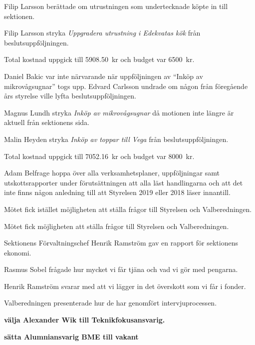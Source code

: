 \documentclass[10pt]{article}
\begin{document}
\begin{paragrafer}
Filip Larsson berättade om utrustningen som undertecknade köpte in till sektionen.

Filip Larsson \ypa stryka \emph{Uppgradera utrustning i Edekvatas kök} från beslutsuppföljningen. 

    Total kostnad uppgick till \SI{5908,50}{kr} och budget var \SI{6500}{kr}.

\Mbaby

Daniel Bakic var inte närvarande när uppföljningen av ``Inköp av mikrovågsugnar'' togs upp. Edvard Carlsson undrade om någon från 		föregående års styrelse ville lyfta beslutsuppföljningen. 

Magnus Lundh \ypa stryka \emph{Inköp av mikrovågsugnar} då motionen inte längre är aktuell från sektionens sida.

\Mbaby

Malin Heyden \ypa stryka \emph{Inköp av toppar till Vega} från beslutsuppföljningen. 

    Total kostnad uppgick till \SI{7052,16}{kr} och budget var \SI{8000}{kr}. 

\Mbaby

Adam Belfrage \ypa hoppa över alla verksamhetsplaner, 
    uppföljningar samt utskottsrapporter under förutsättningen att alla läst handlingarna och att det inte finns någon 
        anledning till att Styrelsen 2019 eller 2018 läser innantill.

\Mbaby

Mötet fick istället möjligheten att ställa frågor till Styrelsen och Valberedningen.

Mötet fick möjligheten att ställa frågor till Styrelsen och Valberedningen.


Sektionens Förvaltningschef Henrik Ramström gav en rapport för sektionens ekonomi.

Rasmus Sobel frågade hur mycket vi får tjäna och vad vi gör med pengarna.

Henrik Ramström svarar med att vi lägger in det överskott som vi får i fonder. 


Valberedningen presenterade hur de har genomfört intervjuprocessen.

\textbf{\Mba välja Alexander Wik till Teknikfokusansvarig.}\par

\textbf{\Mba sätta Alumniansvarig BME till vakant}


\end{paragrafer}
\end{document}
